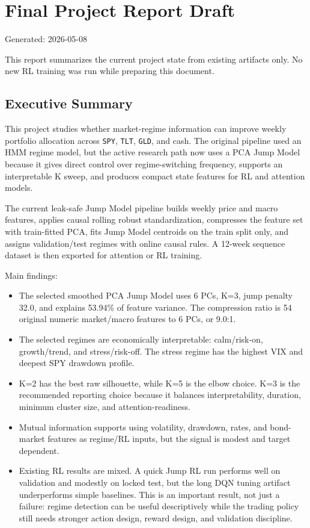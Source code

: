 \section{Final Project Report Draft}\label{final-project-report-draft}

Generated: 2026-05-08

This report summarizes the current project state from existing artifacts
only. No new RL training was run while preparing this document.

\subsection{Executive Summary}\label{executive-summary}

This project studies whether market-regime information can improve
weekly portfolio allocation across \texttt{SPY}, \texttt{TLT},
\texttt{GLD}, and cash. The original pipeline used an HMM regime model,
but the active research path now uses a PCA Jump Model because it gives
direct control over regime-switching frequency, supports an
interpretable K sweep, and produces compact state features for RL and
attention models.

The current leak-safe Jump Model pipeline builds weekly price and macro
features, applies causal rolling robust standardization, compresses the
feature set with train-fitted PCA, fits Jump Model centroids on the
train split only, and assigns validation/test regimes with online causal
rules. A 12-week sequence dataset is then exported for attention or RL
training.

Main findings:

\begin{itemize}
\tightlist
\item
  The selected smoothed PCA Jump Model uses 6 PCs, K=3, jump penalty
  32.0, and explains 53.94\% of feature variance. The compression ratio
  is 54 original numeric market/macro features to 6 PCs, or 9.0:1.
\item
  The selected regimes are economically interpretable: calm/risk-on,
  growth/trend, and stress/risk-off. The stress regime has the highest
  VIX and deepest SPY drawdown profile.
\item
  K=2 has the best raw silhouette, while K=5 is the elbow choice. K=3 is
  the recommended reporting choice because it balances interpretability,
  duration, minimum cluster size, and attention-readiness.
\item
  Mutual information supports using volatility, drawdown, rates, and
  bond-market features as regime/RL inputs, but the signal is modest and
  target dependent.
\item
  Existing RL results are mixed. A quick Jump RL run performs well on
  validation and modestly on locked test, but the long DQN tuning
  artifact underperforms simple baselines. This is an important result,
  not just a failure: regime detection can be useful descriptively while
  the trading policy still needs stronger action design, reward design,
  and validation discipline.
\end{itemize}

